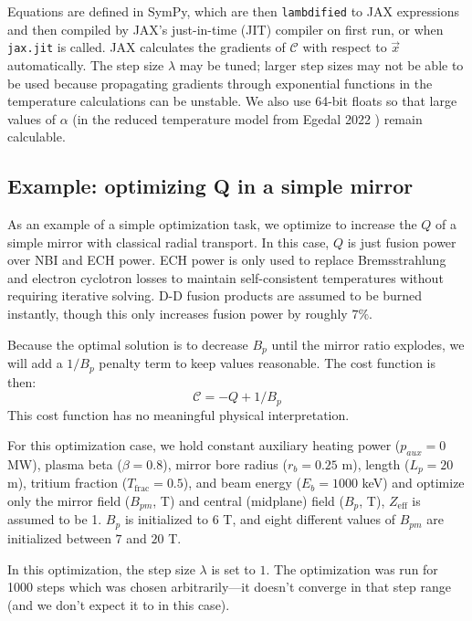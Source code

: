 Equations are defined in SymPy, which are then \texttt{lambdified} to JAX expressions and then compiled by JAX's just-in-time (JIT) compiler on first run, or when \texttt{jax.jit} is called. JAX \cite{jax_doc} calculates the gradients of $\mathcal{C}$ with respect to $\vec{x}$ automatically. The step size $\lambda$ may be tuned; larger step sizes may not be able to be used because propagating gradients through exponential functions in the temperature calculations can be unstable. We also use 64-bit floats so that large values of $\alpha$ (in the reduced temperature model from Egedal 2022 \cite{Egedal_2022}) remain calculable. 

\subsection{Example: optimizing Q in a simple mirror}
As an example of a simple optimization task, we optimize to increase the $Q$ of a simple mirror with classical radial transport. In this case, $Q$ is just fusion power over NBI and ECH power. ECH power is only used to replace Bremsstrahlung and electron cyclotron losses to maintain self-consistent temperatures without requiring iterative solving. D-D fusion products are assumed to be burned instantly, though this only increases fusion power by roughly $7\%$.

Because the optimal solution is to decrease $B_p$ until the mirror ratio explodes, we will add a $1/B_p$ penalty term to keep values reasonable. The cost function is then:
\begin{equation}
    \mathcal{C} = - Q + 1/B_p
\end{equation}
This cost function has no meaningful physical interpretation.

For this optimization case, we hold constant auxiliary heating power ($p_{aux} =0 $ MW), plasma beta ($\beta = 0.8$), mirror bore radius ($r_b = 0.25$ m), length ($L_p = 20$ m), tritium fraction ($T_\text{frac} = 0.5$), and beam energy ($E_b = 1000$ keV) and optimize only the mirror field ($B_{pm}$, T) and central (midplane) field ($B_p$, T), $Z_\text{eff}$ is assumed to be 1. $B_p$ is initialized to $6$ T, and eight different values of $B_{pm}$ are initialized between $7$ and $20$ T.

In this optimization, the step size $\lambda$ is set to $1$. The optimization was run for 1000 steps which was chosen arbitrarily—it doesn't converge in that step range (and we don't expect it to in this case). 

